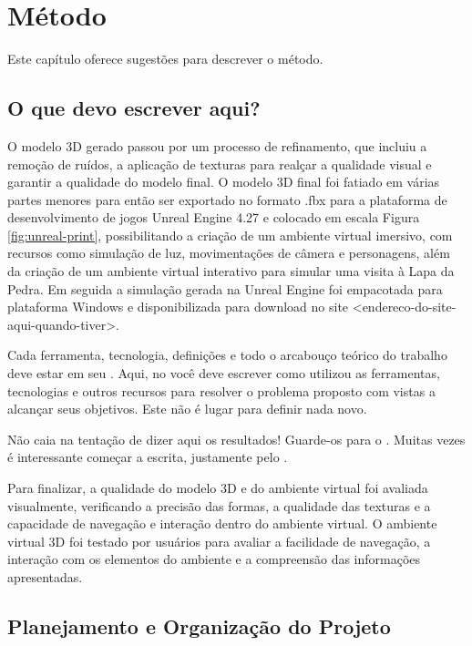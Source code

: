 \chapter{Método}
\label{Metodo}
\indent
Este capítulo oferece sugestões para descrever o método.

\section{O que devo escrever aqui?}%

O modelo 3D gerado passou por um processo de refinamento, que incluiu a remoção de ruídos, a aplicação de texturas para realçar a qualidade visual e garantir a qualidade do modelo final. O modelo 3D final foi fatiado em várias partes menores para então ser exportado no formato .fbx para a plataforma de desenvolvimento de jogos Unreal Engine 4.27 e colocado em escala Figura \ref{fig:unreal-print}, possibilitando a criação de um ambiente virtual imersivo, com recursos como simulação de luz, movimentações de câmera e personagens, além da criação de um ambiente virtual interativo para simular uma visita à Lapa da Pedra. Em seguida a simulação gerada na Unreal Engine foi empacotada para plataforma Windows e disponibilizada para download no site 
<endereco-do-site-aqui-quando-tiver>.


Cada ferramenta, tecnologia, definições e todo o arcabouço teórico do trabalho deve estar em seu .
Aqui, no  você deve escrever como utilizou as ferramentas, tecnologias e outros recursos para resolver o problema proposto com vistas a alcançar seus objetivos.
Este não é lugar para definir nada novo.


Não caia na tentação de dizer aqui os resultados! Guarde-os para o . Muitas vezes é interessante começar a escrita, justamente pelo .



Para finalizar, a qualidade do modelo 3D e do ambiente virtual foi avaliada visualmente, verificando a precisão das formas, a qualidade das texturas e a capacidade de navegação e interação dentro do ambiente virtual. O ambiente virtual 3D foi testado por usuários para avaliar a facilidade de navegação, a interação com os elementos do ambiente e a compreensão das informações apresentadas.


\section{Planejamento e Organização do Projeto}
